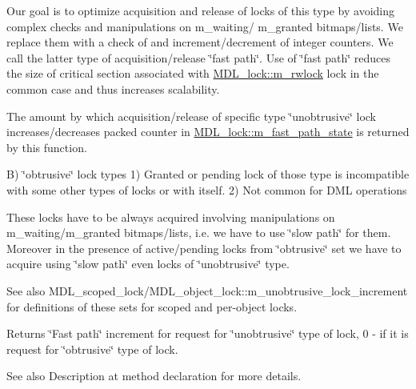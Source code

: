 Our goal is to optimize acquisition and release of locks of this type by avoiding complex checks and manipulations on m\+\_\+waiting/ m\+\_\+granted bitmaps/lists. We replace them with a check of and increment/decrement of integer counters. We call the latter type of acquisition/release \char`\"{}fast path\char`\"{}. Use of \char`\"{}fast path\char`\"{} reduces the size of critical section associated with \mbox{\hyperlink{classMDL__lock_a1308b4506d8cb6d754b4f173e3aa4962}{M\+D\+L\+\_\+lock\+::m\+\_\+rwlock}} lock in the common case and thus increases scalability.

The amount by which acquisition/release of specific type \char`\"{}unobtrusive\char`\"{} lock increases/decreases packed counter in \mbox{\hyperlink{classMDL__lock_ae680877b7079a862d294ccbefed6372c}{M\+D\+L\+\_\+lock\+::m\+\_\+fast\+\_\+path\+\_\+state}} is returned by this function.

B) \char`\"{}obtrusive\char`\"{} lock types 1) Granted or pending lock of those type is incompatible with some other types of locks or with itself. 2) Not common for D\+ML operations

These locks have to be always acquired involving manipulations on m\+\_\+waiting/m\+\_\+granted bitmaps/lists, i.\+e. we have to use \char`\"{}slow path\char`\"{} for them. Moreover in the presence of active/pending locks from \char`\"{}obtrusive\char`\"{} set we have to acquire using \char`\"{}slow path\char`\"{} even locks of \char`\"{}unobtrusive\char`\"{} type.

\begin{DoxySeeAlso}{See also}
M\+D\+L\+\_\+scoped\+\_\+lock/\+M\+D\+L\+\_\+object\+\_\+lock\+::m\+\_\+unobtrusive\+\_\+lock\+\_\+increment for definitions of these sets for scoped and per-\/object locks.
\end{DoxySeeAlso}
\begin{DoxyReturn}{Returns}
\char`\"{}\+Fast path\char`\"{} increment for request for \char`\"{}unobtrusive\char`\"{} type of lock, 0 -\/ if it is request for \char`\"{}obtrusive\char`\"{} type of lock.
\end{DoxyReturn}
\begin{DoxySeeAlso}{See also}
Description at method declaration for more details. 
\end{DoxySeeAlso}
\mbox{\label{classMDL__lock_aa5f2a62914d438aa6e97a50fc8050c74}} 

